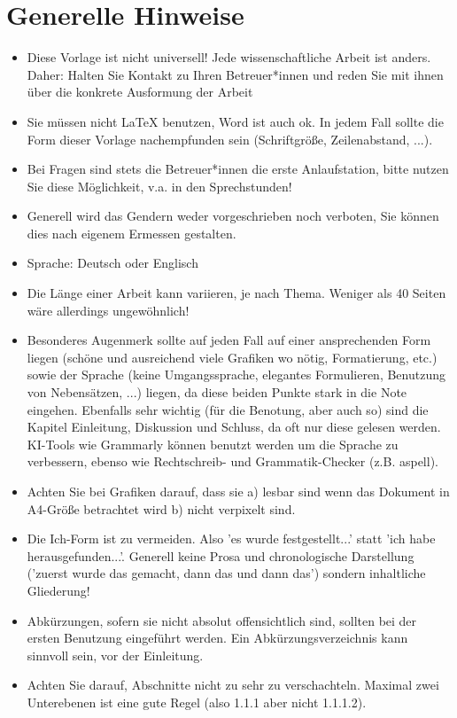 \documentclass[12pt,oneside]{article}
\begin{document}
\section {Generelle Hinweise}
\begin{itemize}
    \item Diese Vorlage ist nicht universell! Jede wissenschaftliche Arbeit ist anders. Daher: Halten Sie Kontakt zu Ihren Betreuer*innen und reden Sie mit ihnen über die konkrete Ausformung der Arbeit
    \item Sie müssen nicht LaTeX benutzen, Word ist auch ok. In jedem Fall sollte die Form dieser Vorlage nachempfunden sein (Schriftgröße, Zeilenabstand, ...).
    \item Bei Fragen sind stets die Betreuer*innen die erste Anlaufstation, bitte nutzen Sie diese Möglichkeit, v.a. in den Sprechstunden!
    \item Generell wird das Gendern weder vorgeschrieben noch verboten, Sie können dies nach eigenem Ermessen gestalten. 
    \item Sprache: Deutsch oder Englisch
     \item Die Länge einer Arbeit kann variieren, je nach Thema. Weniger als 40 Seiten wäre allerdings ungewöhnlich!
     \item Besonderes Augenmerk sollte auf jeden Fall auf einer ansprechenden Form liegen (schöne und ausreichend viele Grafiken wo nötig, Formatierung, etc.) sowie der Sprache (keine Umgangssprache, elegantes Formulieren, Benutzung von Nebensätzen, ...) liegen, da diese beiden Punkte stark in die Note eingehen. Ebenfalls sehr wichtig (für die Benotung, aber auch so) sind die Kapitel Einleitung, Diskussion und Schluss, da oft nur diese gelesen werden. KI-Tools wie Grammarly können benutzt werden um die Sprache zu verbessern, ebenso wie Rechtschreib- und Grammatik-Checker (z.B. aspell). 
     \item Achten Sie bei Grafiken darauf, dass sie a) lesbar sind wenn das Dokument in A4-Größe betrachtet wird b) nicht verpixelt sind.
     \item Die Ich-Form ist zu vermeiden. Also 'es wurde festgestellt...' statt 'ich habe herausgefunden...'. Generell keine Prosa und chronologische Darstellung ('zuerst wurde das gemacht, dann das und dann das') sondern inhaltliche Gliederung!
     \item Abkürzungen, sofern sie nicht absolut offensichtlich sind, sollten bei der ersten Benutzung eingeführt werden. Ein Abkürzungsverzeichnis kann sinnvoll sein, vor der Einleitung.
     \item Achten Sie darauf, Abschnitte nicht zu sehr zu verschachteln. Maximal zwei Unterebenen ist eine gute Regel (also 1.1.1 aber nicht 1.1.1.2). 
\end{itemize}
\end{document}
